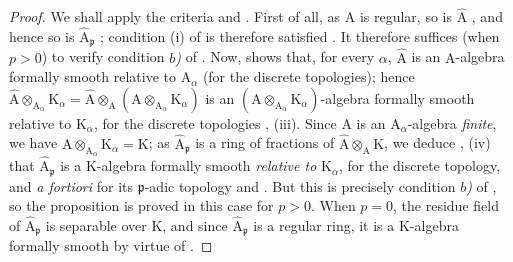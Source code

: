 \begin{proof}
We shall apply the criteria  and .
First of all, as $\mathrm{A}$ is regular, so is $\widehat{\mathrm{A}}$ , and hence so is $\widehat{\mathrm{A}}_\mathfrak{p}$ ; condition (i) of  is therefore satisfied .
It therefore suffices (when $p>0$) to verify condition \emph{$b$)} of .
Now,  shows that, for every $\alpha$, $\widehat{\mathrm{A}}$ is an $\mathrm{A}$-algebra formally smooth relative to $\mathrm{A}_\alpha$ (for the discrete topologies); hence $\widehat{\mathrm{A}}\otimes_{\mathrm{A}_\alpha}\mathrm{K}_\alpha=\widehat{\mathrm{A}}\otimes_\mathrm{A}(\mathrm{A}\otimes_{\mathrm{A}_\alpha}\mathrm{K}_\alpha)$ is an $(\mathrm{A}\otimes_{\mathrm{A}_\alpha}\mathrm{K}_\alpha)$-algebra formally smooth relative to $\mathrm{K}_\alpha$, for the discrete topologies , (iii).
Since $\mathrm{A}$ is an $\mathrm{A}_\alpha$-algebra \emph{finite}, we have $\mathrm{A}\otimes_{\mathrm{A}_\alpha}\mathrm{K}_\alpha=\mathrm{K}$; as $\widehat{\mathrm{A}}_\mathfrak{p}$ is a ring of fractions of $\widehat{\mathrm{A}}\otimes_\mathrm{A}\mathrm{K}$, we deduce , (iv) that $\widehat{\mathrm{A}}_\mathfrak{p}$ is a $\mathrm{K}$-algebra formally smooth \emph{relative to} $\mathrm{K}_\alpha$, for the discrete topology, and \emph{a fortiori} for its $\mathfrak{p}$-adic topology  and .
But this is precisely condition \emph{$b$)} of , so the proposition is proved in this case for $p>0$.
When $p=0$, the residue field of $\widehat{\mathrm{A}}_\mathfrak{p}$ is separable over $\mathrm{K}$, and since $\widehat{\mathrm{A}}_\mathfrak{p}$ is a regular ring, it is a $\mathrm{K}$-algebra formally smooth by virtue of .


\end{proof}
